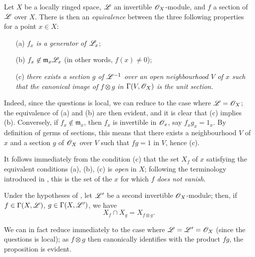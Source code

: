 \begin{env}[5.5.2]
\label{0.5.5.2}
Let $X$ be a locally ringed space, $\mathscr{L}$ an invertible $\mathscr{O}_X$-module, and $f$ a section of $\mathscr{L}$ over $X$.
There is then an \emph{equivalence} between the three following properties for a point $x\in X$:
\begin{enumerate}
  \item[(a)] \emph{$f_x$ is a generator of $\mathscr{L}_x$};
  \item[(b)] \emph{$f_x\not\in\mathfrak{m}_x\mathscr{L}_x$} (in other words, $f(x)\neq 0$);
  \item[(c)] \emph{there exists a section $g$ of $\mathscr{L}^{-1}$ over an open neighbourhood $V$ of $x$ such that the canonical image of $f\otimes g$ in $\Gamma(V,\mathscr{O}_X)$  is the unit section}.
\end{enumerate}

Indeed, since the questions is local, we can reduce to the case where $\mathscr{L}=\mathscr{O}_X$;
the equivalence of (a) and (b) are then evident, and it is clear that (c) implies (b).
Conversely, if $f_x\not\in\mathfrak{m}_x$, then $f_x$ is invertible in $\mathscr{O}_x$, say $f_x g_x=1_x$.
By definition of germs of sections, this means that there exists a neighbourhood $V$ of $x$ and a section $g$ of $\mathscr{O}_X$ over $V$ such that $fg=1$ in $V$, hence (c).

It follows immediately from the condition (c) that the set $X_f$ of $x$ satisfying the equivalent conditions (a), (b), (c) is \emph{open} in $X$;
following the terminology introduced in , this is the set of the $x$ for which \emph{$f$ does not vanish}.
\end{env}

\begin{env}[5.5.3]
\label{0.5.5.3}
Under the hypotheses of , let $\mathscr{L}'$ be a second invertible $\mathscr{O}_X$-module;
then, if $f\in\Gamma(X,\mathscr{L})$, $g\in\Gamma(X,\mathscr{L}')$, we have
\[
  X_f\cap X_g=X_{f\otimes g}.
\]

We can in fact reduce immediately to the case where $\mathscr{L}=\mathscr{L}'=\mathscr{O}_X$ (since the questions is local);
as $f\otimes g$ then canonically identifies with the product $fg$, the proposition is evident.
\end{env}

